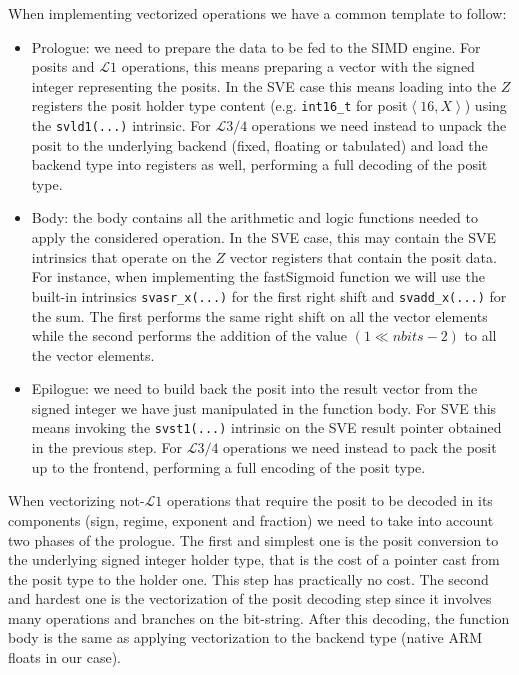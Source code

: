 When implementing vectorized operations we have a common template to follow: 
\begin{itemize}
    \item Prologue: we need to prepare the data to be fed to the SIMD engine. For posits and $\mathcal{L}1$ operations, this means preparing a vector with the signed integer representing the posits. In the SVE case this means loading into the $Z$ registers the posit holder type content (e.g. \texttt{int16\_t} for posit$\left<16,X\right>$) using the \texttt{svld1(...)} intrinsic. For $\mathcal{L}3/4$ operations we need instead to unpack the posit to the underlying backend (fixed, floating or tabulated) and load the backend type into registers as well, performing a full decoding of the posit type.
    \item Body: the body contains all the arithmetic and logic functions needed to apply the considered operation. In the SVE case, this may contain the SVE intrinsics that operate on the $Z$ vector registers that contain the posit data. For instance, when implementing the fastSigmoid function we will use the built-in intrinsics \texttt{svasr\_x(...)} for the first right shift and \texttt{sv\-add\_x(...)} for the sum. The first performs the same right shift on all the vector elements while the second performs the addition of the value $(1\ll nbits-2)$ to all the vector elements.
    \item Epilogue: we need to build back the posit into the result vector from the signed integer we have just manipulated in the function body. For SVE this means invoking the \texttt{svst1(...)} intrinsic on the SVE result pointer obtained in the previous step. For $\mathcal{L}3/4$ operations we need instead to pack the posit up to the frontend, performing a full encoding of the posit type.
\end{itemize}

When vectorizing not-$\mathcal{L}1$ operations that require the posit to be decoded in its components (sign, regime, exponent and fraction) we need to take into account two phases of the prologue. The first and simplest one is the posit conversion to the underlying signed integer holder type, that is the cost of a pointer cast from the posit type to the holder one. This step has practically no cost. The second and hardest one is the vectorization of the posit decoding step since it involves many operations and branches on the bit-string. After this decoding, the function body is the same as applying vectorization to the backend type (native ARM floats in our case).

